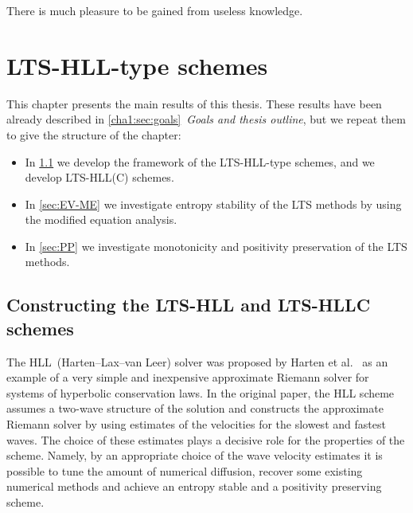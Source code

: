
\begin{savequote}[50mm]
There is much pleasure to be gained from useless knowledge.
\end{savequote}

\chapter{LTS-HLL-type schemes}
\label{cha:LTS-HLL}


This chapter presents the main results of this thesis. These results have been already described in \ref{cha1:sec:goals}~\textit{Goals and thesis outline}, but we repeat them to give the structure of the chapter:
\begin{itemize}
\item In \cref{sec:LTS-HLL(C)} we develop the framework of the LTS-HLL-type schemes, and we develop LTS-HLL(C) schemes.

\item In \cref{sec:EV-ME} we investigate entropy stability of the LTS methods by using the modified equation analysis.

\item In \cref{sec:PP} we investigate monotonicity and positivity preservation of the LTS methods. 
\end{itemize}

\section{Constructing the LTS-HLL and LTS-HLLC schemes}
\label{sec:LTS-HLL(C)}

The HLL~(Harten--Lax--van Leer) solver was proposed by Harten et al.~\cite{har83a} as an example of a very simple and inexpensive approximate Riemann solver for systems of hyperbolic conservation laws. In the original paper, the HLL scheme assumes a two-wave structure of the solution and constructs the approximate Riemann solver by using estimates of the velocities for the slowest and fastest waves. The choice of these estimates plays a decisive role for the properties of the scheme. Namely, by an appropriate choice of the wave velocity estimates it is possible to tune the amount of numerical diffusion, recover some existing numerical methods and achieve an entropy stable and a positivity preserving scheme. 

